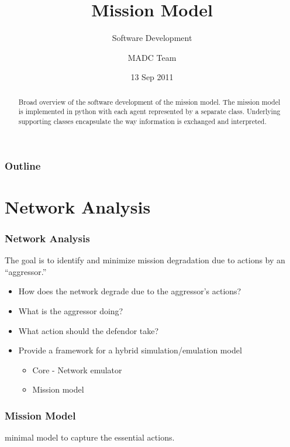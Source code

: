\documentclass{beamer}
\begin{document}
\title{Mission Model}
\subtitle{Software Development}
\author{MADC Team}
\date{13 Sep 2011}

\begin{frame}
  \titlepage
  \begin{abstract}
    Broad overview of the software development of the mission
    model. The mission model is implemented in python with each agent
    represented by a separate class. Underlying supporting classes
    encapsulate the way information is exchanged and interpreted.
  \end{abstract}
\end{frame}



\begin{frame}
  \frametitle{Outline}
\end{frame}


\section{Network Analysis}

\begin{frame}
  \frametitle{Network Analysis}
  
  The goal is to identify and minimize mission degradation due to
  actions by an ``aggressor.''  

  \begin{itemize}
  \item How does the network degrade due to the aggressor's actions?
  \item What is the aggressor doing?
  \item What action should the defendor take?
  \item Provide a framework for a hybrid simulation/emulation model
    \begin{itemize}
    \item Core - Network emulator
    \item Mission model 
    \end{itemize}
  \end{itemize}

\end{frame}


\begin{frame}
  \frametitle{Mission Model}

  minimal model to capture the essential actions.

\end{frame}
\end{document}
